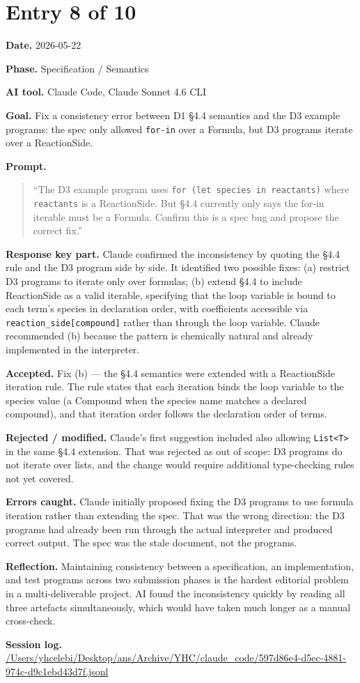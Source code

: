 \documentclass[11pt,a4paper]{article}
\newcommand{\field}[2]{\textbf{#1.} #2\par}
\newcommand{\prompt}[1]{%
  \textbf{Prompt.}
  \begin{quote}\small #1\end{quote}
}
\newcommand{\sessionlog}[1]{\textbf{Session log.} \url{#1}\par}
\begin{document}
\section{Entry 8 of 10}
\field{Date}{2026-05-22}
\field{Phase}{Specification / Semantics}
\field{AI tool}{Claude Code, Claude Sonnet 4.6 CLI}
\field{Goal}{Fix a consistency error between D1 \S4.4 semantics and the D3 example programs: the spec only allowed \texttt{for-in} over a Formula, but D3 programs iterate over a ReactionSide.}
\prompt{``The D3 example program uses \texttt{for (let species in reactants)} where \texttt{reactants} is a ReactionSide. But \S4.4 currently only says the for-in iterable must be a Formula. Confirm this is a spec bug and propose the correct fix.''}
\field{Response key part}{Claude confirmed the inconsistency by quoting the \S4.4 rule and the D3 program side by side. It identified two possible fixes: (a) restrict D3 programs to iterate only over formulas; (b) extend \S4.4 to include ReactionSide as a valid iterable, specifying that the loop variable is bound to each term's species in declaration order, with coefficients accessible via \texttt{reaction\_side[compound]} rather than through the loop variable. Claude recommended (b) because the pattern is chemically natural and already implemented in the interpreter.}
\field{Accepted}{Fix (b) --- the \S4.4 semantics were extended with a ReactionSide iteration rule. The rule states that each iteration binds the loop variable to the species value (a Compound when the species name matches a declared compound), and that iteration order follows the declaration order of terms.}
\field{Rejected / modified}{Claude's first suggestion included also allowing \texttt{List<T>} in the same \S4.4 extension. That was rejected as out of scope: D3 programs do not iterate over lists, and the change would require additional type-checking rules not yet covered.}
\field{Errors caught}{Claude initially proposed fixing the D3 programs to use formula iteration rather than extending the spec. That was the wrong direction: the D3 programs had already been run through the actual interpreter and produced correct output. The spec was the stale document, not the programs.}
\field{Reflection}{Maintaining consistency between a specification, an implementation, and test programs across two submission phases is the hardest editorial problem in a multi-deliverable project. AI found the inconsistency quickly by reading all three artefacts simultaneously, which would have taken much longer as a manual cross-check.}
\sessionlog{/Users/yhcelebi/Desktop/ans/Archive/YHC/claude_code/597d86e4-d5ec-4881-974c-d9c1ebd43d7f.jsonl}
\end{document}
